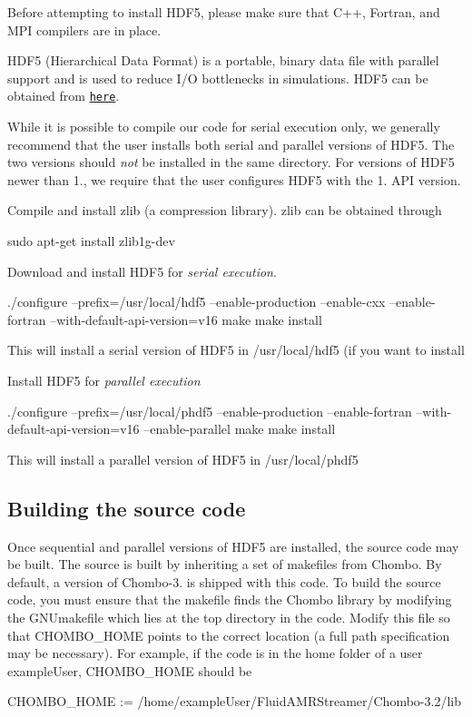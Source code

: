 Before attempting to install H\+D\+F5, please make sure that C++, Fortran, and M\+PI compilers are in place.

H\+D\+F5 (Hierarchical Data Format) is a portable, binary data file with parallel support and is used to reduce I/O bottlenecks in simulations. H\+D\+F5 can be obtained from \href{https://support.hdfgroup.org/HDF5/}{\tt here}.

While it is possible to compile our code for serial execution only, we generally recommend that the user installs both serial and parallel versions of H\+D\+F5. The two versions should {\itshape not} be installed in the same directory. For versions of H\+D\+F5 newer than 1., we require that the user configures H\+D\+F5 with the 1. A\+PI version.


\begin{DoxyEnumerate}
\item Compile and install zlib (a compression library). zlib can be obtained through \begin{DoxyVerb} sudo apt-get install zlib1g-dev
\end{DoxyVerb}

\item Download and install H\+D\+F5 for {\itshape serial execution}. \begin{DoxyVerb} ./configure --prefix=/usr/local/hdf5 --enable-production --enable-cxx --enable-fortran --with-default-api-version=v16
 make
 make install
\end{DoxyVerb}


This will install a serial version of H\+D\+F5 in /usr/local/hdf5 (if you want to install
\item Install H\+D\+F5 for {\itshape parallel execution} \begin{DoxyVerb} ./configure --prefix=/usr/local/phdf5 --enable-production --enable-fortran --with-default-api-version=v16 --enable-parallel
 make
 make install
\end{DoxyVerb}


This will install a parallel version of H\+D\+F5 in /usr/local/phdf5
\end{DoxyEnumerate}

\subsection*{Building the source code }

Once sequential and parallel versions of H\+D\+F5 are installed, the source code may be built. The source is built by inheriting a set of makefiles from Chombo. By default, a version of Chombo-\/3. is shipped with this code. To build the source code, you must ensure that the makefile finds the Chombo library by modifying the G\+N\+Umakefile which lies at the top directory in the code. Modify this file so that {\ttfamily C\+H\+O\+M\+B\+O\+\_\+\+H\+O\+ME} points to the correct location (a full path specification may be necessary). For example, if the code is in the home folder of a user {\ttfamily example\+User}, {\ttfamily C\+H\+O\+M\+B\+O\+\_\+\+H\+O\+ME} should be \begin{DoxyVerb}CHOMBO_HOME := /home/exampleUser/FluidAMRStreamer/Chombo-3.2/lib
\end{DoxyVerb}


